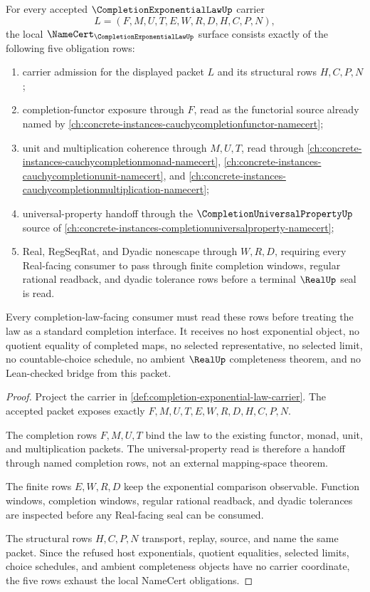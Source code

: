 \begin{theorem}
\label{thm:completion-exponential-law-namecert-obligations}
For every accepted $\CompletionExponentialLawUp$ carrier
$$
L=(F,M,U,T,E,W,R,D,H,C,P,N),
$$
the local $\NameCert_{\CompletionExponentialLawUp}$ surface consists exactly of the following five obligation rows:
\begin{enumerate}
\item carrier admission for the displayed packet $L$ and its structural rows $H,C,P,N$;
\item completion-functor exposure through $F$, read as the functorial source already named by \autoref{ch:concrete-instances-cauchycompletionfunctor-namecert};
\item unit and multiplication coherence through $M,U,T$, read through \autoref{ch:concrete-instances-cauchycompletionmonad-namecert}, \autoref{ch:concrete-instances-cauchycompletionunit-namecert}, and \autoref{ch:concrete-instances-cauchycompletionmultiplication-namecert};
\item universal-property handoff through the $\CompletionUniversalPropertyUp$ source of \autoref{ch:concrete-instances-completionuniversalproperty-namecert};
\item Real, RegSeqRat, and Dyadic nonescape through $W,R,D$, requiring every Real-facing consumer to pass through finite completion windows, regular rational readback, and dyadic tolerance rows before a terminal $\RealUp$ seal is read.
\end{enumerate}
Every completion-law-facing consumer must read these rows before treating the law as a standard completion interface. It receives no host exponential object, no quotient equality of completed maps, no selected representative, no selected limit, no countable-choice schedule, no ambient $\RealUp$ completeness theorem, and no Lean-checked bridge from this packet.
\end{theorem}
\begin{proof}
Project the carrier in \autoref{def:completion-exponential-law-carrier}. The accepted packet exposes exactly $F,M,U,T,E,W,R,D,H,C,P,N$.

The completion rows $F,M,U,T$ bind the law to the existing functor, monad, unit, and multiplication packets. The universal-property read is therefore a handoff through named completion rows, not an external mapping-space theorem.

The finite rows $E,W,R,D$ keep the exponential comparison observable. Function windows, completion windows, regular rational readback, and dyadic tolerances are inspected before any Real-facing seal can be consumed.

The structural rows $H,C,P,N$ transport, replay, source, and name the same packet. Since the refused host exponentials, quotient equalities, selected limits, choice schedules, and ambient completeness objects have no carrier coordinate, the five rows exhaust the local NameCert obligations.
\end{proof}

